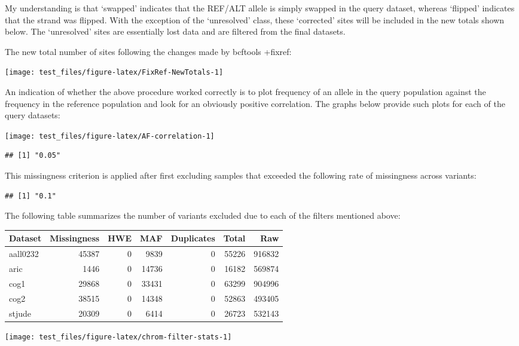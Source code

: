 \documentclass[]{article}
\begin{document}
My understanding is that `swapped' indicates that the REF/ALT allele is
simply swapped in the query dataset, whereas `flipped' indicates that
the strand was flipped. With the exception of the `unresolved' class,
these `corrected' sites will be included in the new totals shown below.
The `unresolved' sites are essentially lost data and are filtered from
the final datasets.

The new total number of sites following the changes made by bcftools
+fixref:

\begin{center}\texttt{[image: test\_files/figure-latex/FixRef-NewTotals-1]} \end{center}

An indication of whether the above procedure worked correctly is to plot
frequency of an allele in the query population against the frequency in
the reference population and look for an obviously positive correlation.
The graphs below provide such plots for each of the query datasets:

\begin{center}\texttt{[image: test\_files/figure-latex/AF-correlation-1]} \end{center}

\begin{verbatim}
## [1] "0.05"
\end{verbatim}

This missingness criterion is applied after first excluding samples that
exceeded the following rate of missingness across variants:

\begin{verbatim}
## [1] "0.1"
\end{verbatim}

The following table summarizes the number of variants excluded due to
each of the filters mentioned above:

\begin{longtable}[]{@{}lrrrrrr@{}}
\toprule
Dataset & Missingness & HWE & MAF & Duplicates & Total &
Raw\tabularnewline
\midrule
\endhead
aall0232 & 45387 & 0 & 9839 & 0 & 55226 & 916832\tabularnewline
aric & 1446 & 0 & 14736 & 0 & 16182 & 569874\tabularnewline
cog1 & 29868 & 0 & 33431 & 0 & 63299 & 904996\tabularnewline
cog2 & 38515 & 0 & 14348 & 0 & 52863 & 493405\tabularnewline
stjude & 20309 & 0 & 6414 & 0 & 26723 & 532143\tabularnewline
\bottomrule
\end{longtable}

\begin{center}\texttt{[image: test\_files/figure-latex/chrom-filter-stats-1]} \end{center}
\end{document}
